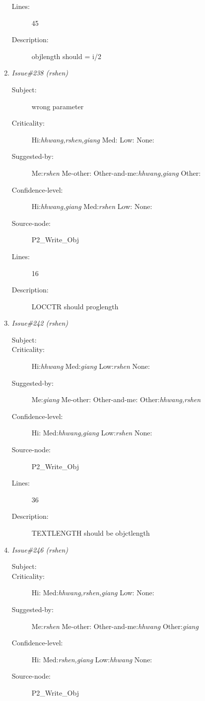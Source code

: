 \begin{enumerate}
\begin{description}
\item [Lines:] 45

\item [Description:] objlength should = i/2
\end{description}
\item {\it Issue\#238 (rshen)}
\begin{description}
\item [Subject:] wrong parameter
\item [Criticality:] Hi:{\it hhwang,rshen,giang} Med:{\it } Low:{\it } None:{\it }
\item [Suggested-by:] Me:{\it rshen} Me-other:{\it } Other-and-me:{\it hhwang,giang} Other:{\it }
\item [Confidence-level:] Hi:{\it hhwang,giang} Med:{\it rshen} Low:{\it } None:{\it }
\item [Source-node:] P2\_Write\_Obj

\item [Lines:] 16

\item [Description:] LOCCTR should proglength
\end{description}
\item {\it Issue\#242 (rshen)}
\begin{description}
\item [Subject:] 
\item [Criticality:] Hi:{\it hhwang} Med:{\it giang} Low:{\it rshen} None:{\it }
\item [Suggested-by:] Me:{\it giang} Me-other:{\it } Other-and-me:{\it } Other:{\it hhwang,rshen}
\item [Confidence-level:] Hi:{\it } Med:{\it hhwang,giang} Low:{\it rshen} None:{\it }
\item [Source-node:] P2\_Write\_Obj

\item [Lines:] 36

\item [Description:] TEXTLENGTH should be objctlength
\end{description}
\item {\it Issue\#246 (rshen)}
\begin{description}
\item [Subject:] 
\item [Criticality:] Hi:{\it } Med:{\it hhwang,rshen,giang} Low:{\it } None:{\it }
\item [Suggested-by:] Me:{\it rshen} Me-other:{\it } Other-and-me:{\it hhwang} Other:{\it giang}
\item [Confidence-level:] Hi:{\it } Med:{\it rshen,giang} Low:{\it hhwang} None:{\it }
\item [Source-node:] P2\_Write\_Obj


\end{description}
\end{enumerate}
